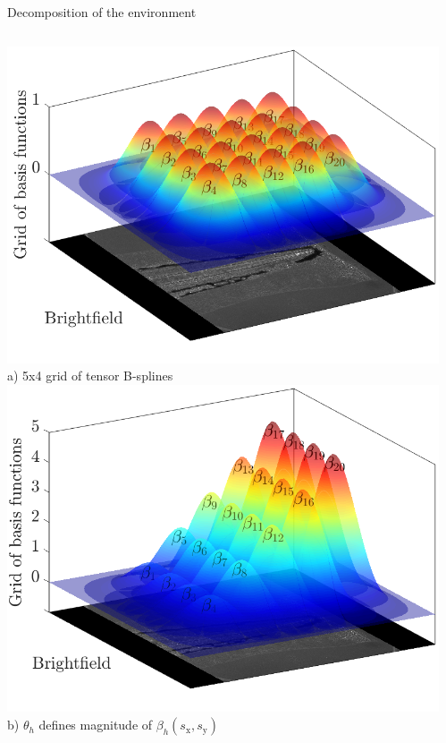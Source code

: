 \documentclass[mathserif,11pt]{beamer}
\begin{document}
\begin{frame}{Decomposition of the environment}
\begin{columns}
\begin{column}{0.4\textwidth}
	\centering
	\includegraphics[scale=0.2]{Figures/grid.png}\\
	\footnotesize{a) 5x4 grid of tensor B-splines}
	\hfil
	\includegraphics[scale=0.2]{Figures/grid2.png}\\
	\footnotesize{b) $\theta_h$ defines magnitude of $\beta_h (s_{\mathrm{x}}, s_{\mathrm{y}})$}
\end{column}
\begin{column}{0.5\textwidth}
	\centering
	\vspace{-0.5cm}
	\begin{equation*}\label{eq_field}

\end{equation*}
\end{column}
\end{columns}
\end{frame}
\end{document}
